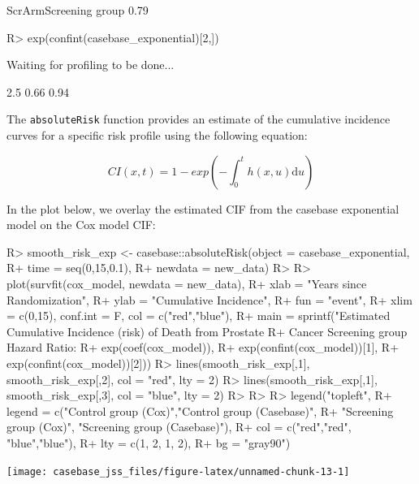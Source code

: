 \documentclass[article]{jss}
\begin{document}
\begin{CodeChunk}
\begin{CodeOutput}
ScrArmScreening group 
                 0.79 
\end{CodeOutput}

\begin{CodeInput}
R> exp(confint(casebase_exponential)[2,])
\end{CodeInput}

\begin{CodeOutput}
Waiting for profiling to be done...
\end{CodeOutput}

\begin{CodeOutput}
 2.5 %
  0.66   0.94 
\end{CodeOutput}
\end{CodeChunk}

The \texttt{absoluteRisk} function provides an estimate of the
cumulative incidence curves for a specific risk profile using the
following equation:

\[ CI(x, t) = 1 - exp\left( - \int_0^t h(x, u) \textrm{d}u \right) \]

In the plot below, we overlay the estimated CIF from the casebase
exponential model on the Cox model CIF:

\begin{CodeChunk}

\begin{CodeInput}
R> smooth_risk_exp <- casebase::absoluteRisk(object = casebase_exponential, 
R+                                           time = seq(0,15,0.1), 
R+                                           newdata = new_data)
R> 
R> plot(survfit(cox_model, newdata = new_data),
R+      xlab = "Years since Randomization", 
R+      ylab = "Cumulative Incidence", 
R+      fun = "event",
R+      xlim = c(0,15), conf.int = F, col = c("red","blue"), 
R+      main = sprintf("Estimated Cumulative Incidence (risk) of Death from Prostate 
R+                     Cancer Screening group Hazard Ratio: %
R+                     exp(coef(cox_model)), 
R+                     exp(confint(cox_model))[1], 
R+                     exp(confint(cox_model))[2]))
R> lines(smooth_risk_exp[,1], smooth_risk_exp[,2], col = "red", lty = 2)
R> lines(smooth_risk_exp[,1], smooth_risk_exp[,3], col = "blue", lty = 2)
R> 
R> 
R> legend("topleft", 
R+        legend = c("Control group (Cox)","Control group (Casebase)",
R+                   "Screening group (Cox)", "Screening group (Casebase)"), 
R+        col = c("red","red", "blue","blue"),
R+        lty = c(1, 2, 1, 2), 
R+        bg = "gray90")
\end{CodeInput}


\begin{center}\texttt{[image: casebase\_jss\_files/figure-latex/unnamed-chunk-13-1]} \end{center}

\end{CodeChunk}
\end{document}
